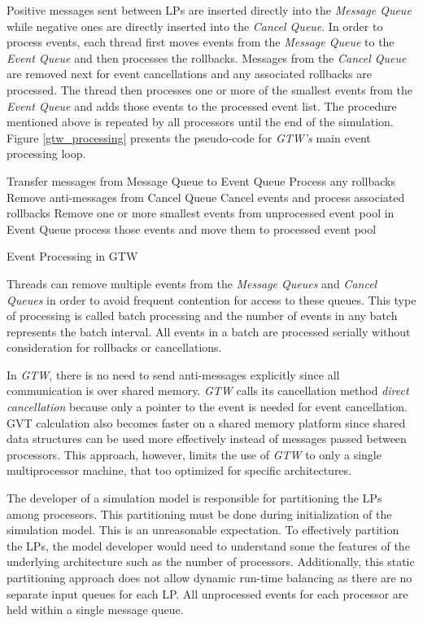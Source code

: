 \documentclass[11pt]{book}
\begin{document}
\noindent
Positive messages sent between LPs are inserted directly into the \emph{Message Queue} while negative ones are
directly inserted into the \emph{Cancel Queue}.  In order to process events, each thread first moves events
from the \emph{Message Queue} to the \emph{Event Queue} and then processes the rollbacks.  Messages from the
\emph{Cancel Queue} are removed next for event cancellations and any associated rollbacks are processed.  The
thread then processes one or more of the smallest events from the \emph{Event Queue} and adds those events to
the processed event list.  The procedure mentioned above is repeated by all processors until the end of the
simulation.  Figure \ref{gtw_processing} presents the pseudo-code for \emph{GTW's} main event processing loop.

\begin{algorithm}
\DontPrintSemicolon
     {
        Transfer messages from Message Queue to Event Queue\;
        Process any rollbacks\;
        Remove anti-messages from Cancel Queue\;
        Cancel events and process associated rollbacks\;
        Remove one or more smallest events from unprocessed event pool in Event Queue\;
        process those events and move them to processed event pool\;
    }
\caption{Event Processing in GTW\cite{das-94,fujimoto-94}\label{gtw_processing}}
\end{algorithm}

Threads can remove multiple events from the \emph{Message Queues} and \emph{Cancel Queues} in order to avoid
frequent contention for access to these queues.  This type of processing is called batch processing and the
number of events in any batch represents the batch interval.  All events in a batch are processed serially
without consideration for rollbacks or cancellations.

In \emph{GTW}, there is no need to send anti-messages explicitly since all communication is over shared
memory.  \emph{GTW} calls its cancellation method \emph{direct cancellation} because only a pointer to the
event is needed for event cancellation.  GVT calculation also becomes faster on a shared memory platform since
shared data structures can be used more effectively instead of messages passed between processors.  This
approach, however, limits the use of \emph{GTW} to only a single multiprocessor machine, that too optimized
for specific architectures.

The developer of a simulation model is responsible for partitioning the LPs among processors.  This
partitioning must be done during initialization of the simulation model.  This is an unreasonable expectation.
To effectively partition the LPs, the model developer would need to understand some the features of the
underlying architecture such as the number of processors.  Additionally, this static partitioning approach
does not allow dynamic run-time balancing as there are no separate input queues for each LP\@.  All
unprocessed events for each processor are held within a single message queue.
\end{document}

